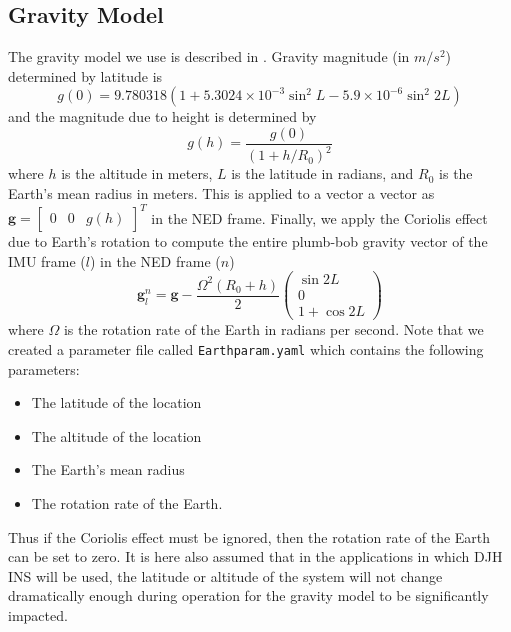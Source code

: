 \documentclass[11pt,a4paper]{article}
\begin{document}
\subsection{Gravity Model}
The gravity model we use is described in \cite{Titterton:2004}. Gravity magnitude (in $m/s^2$) determined by latitude is
\begin{equation}
	g(0) = 9.780318(1+5.3024\times 10^{-3} \sin^2 L - 5.9 \times 10^{-6} \sin^2 2L)
\end{equation}
and the magnitude due to height is determined by
\begin{equation}
	g(h) = \frac{g(0)}{\left(1 + h/R_0\right)^2}
\end{equation}
where $h$ is the altitude in meters, $L$ is the latitude in radians, and $R_0$ is the Earth's mean radius in meters. This is applied to a vector a vector as $\mathbf{g} = \left[\begin{array}{ccc} 0 & 0 & g(h)\end{array}\right]^T$ in the NED frame. Finally, we apply the Coriolis effect due to Earth's rotation to compute the entire plumb-bob gravity vector of the IMU frame ($l$) in the NED frame ($n$)
\begin{equation}
	\mathbf{g}^n_l = \mathbf{g} - \frac{\Omega^2\left(R_0 + h \right)}{2}\left(\begin{array}{c} \sin 2L \\ 0 \\ 1 + \cos 2L \end{array} \right)
\end{equation}
where $\Omega$ is the rotation rate of the Earth in radians per second. Note that we created a parameter file called \texttt{Earthparam.yaml} which contains the following parameters:
\begin{itemize}
	\item The latitude of the location
	\item The altitude of the location
	\item The Earth's mean radius
	\item The rotation rate of the Earth.
\end{itemize}
Thus if the Coriolis effect must be ignored, then the rotation rate of the Earth can be set to zero. It is here also assumed that in the applications in which DJH INS will be used, the latitude or altitude of the system will not change dramatically enough during operation for the gravity model to be significantly impacted. 
\end{document}

